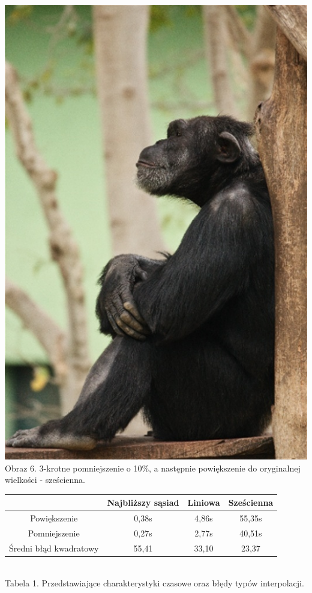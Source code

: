 \documentclass[14pt]{article}
\begin{document}
\begin{center}
    \vspace{0.2cm}
    \includegraphics[scale=0.3]{images/3x_BACK_TO_ORG_bc.jpg}
    \\ \small Obraz 6. 3-krotne pomniejszenie o 10\%, a następnie powiększenie
    do oryginalnej wielkości - sześcienna.

    \vspace{0.25cm}
    \begin{tabular}{|c|c|c|c|}
        \hline
        & Najbliższy sąsiad & Liniowa & Sześcienna  \\ \hline
        Powiększenie & 0,38s & 4,86s & 55,35s \\ \hline
        Pomniejszenie & 0,27s & 2,77s & 40,51s \\ \hline
        Średni błąd kwadratowy & 55,41 & 33,10 & 23,37 \\ \hline

    \end{tabular}
    \vspace{0.2cm}
    \\ \small Tabela 1. Przedstawiające charakterystyki 
    czasowe oraz błędy typów interpolacji.
\end{center}
\end{document}
